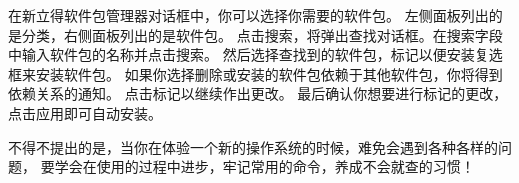 在新立得软件包管理器对话框中，你可以选择你需要的软件包。
左侧面板列出的是分类，右侧面板列出的是软件包。
点击搜索，将弹出查找对话框。在搜索字段中输入软件包的名称并点击搜索。
然后选择查找到的软件包，标记以便安装复选框来安装软件包。
如果你选择删除或安装的软件包依赖于其他软件包，你将得到依赖关系的通知。
点击标记以继续作出更改。
最后确认你想要进行标记的更改，点击应用即可自动安装。
\begin{figure}[htbp]
	\centering
	\hfill
	\label{fig:Synaptic}
\end{figure}

\begin{remark}
	不得不提出的是，当你在体验一个新的操作系统的时候，难免会遇到各种各样的问题，
	要学会在使用的过程中进步，牢记常用的命令，养成不会就查的习惯！
\end{remark}







